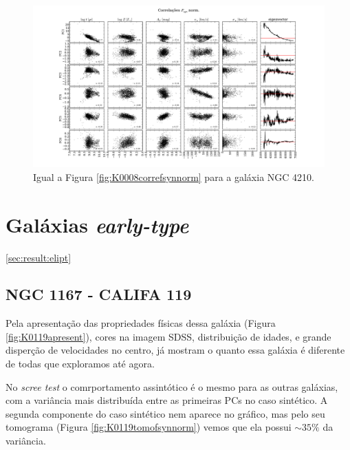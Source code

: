 \begin{figure}
    \includegraphics[width=1.3\textwidth, angle=-90]{figuras/K0518-correl-f_syn_norm-PCvsPhys.pdf}
	\caption[Correlações PCs vs. par\^ametros f\'isicos -um padrão de velocidades $F_{syn}$ norm. - NGC 4210.]
	{Igual a Figura \ref{fig:K0008correfsynnorm} para a galáxia NGC 4210.}
    \label{fig:K0518correfsynnorm}
\end{figure}

\section{Gal\'axias {\em early-type}}
\ref{sec:result:elipt}

\subsection{NGC 1167 - CALIFA 119}

Pela apresentação das propriedades físicas dessa galáxia (Figura \ref{fig:K0119apresent}), cores na imagem SDSS,
distribuição de idades, e grande disperção de velocidades no centro, já mostram o quanto essa galáxia é diferente de
todas que exploramos até agora.

No {\em scree test} o comrportamento assintótico é o mesmo para as outras galáxias, com a variância mais distribuída
entre as primeiras PCs no caso sintético. A segunda componente do caso sintético nem aparece no gráfico, mas pelo seu
tomograma (Figura \ref{fig:K0119tomofsynnorm}) vemos que ela possui $\sim 35\%$ da variância.

